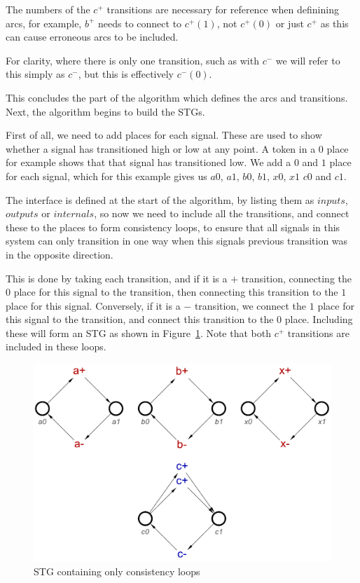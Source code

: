 \documentclass[british,conference,compsoc]{IEEEtran}
\begin{document}
The numbers of the $c^{+}$ transitions are necessary for reference
when definining arcs, for example, $b^{+}$ needs to connect to 
$c^{+}(1)$, not $c^{+}(0)$ or just $c^{+}$ as this can cause 
erroneous arcs to be included. 

For clarity, where there is only one transition, such as with $c^{-}$
we will refer to this simply as $c^{-}$, but this is effectively $c^{-}(0)$.

This concludes the part of the algorithm which defines the arcs
and transitions. Next, the algorithm begins to build the STGs. 

First of all, we need to add places for each signal. These are used to
show whether a signal has transitioned high or low at any point. 
A token in a $0$ place for example shows that that signal has 
transitioned low. We add a $0$ and $1$ place for each signal, 
which for this example gives us $a0$, $a1$, $b0$, $b1$, $x0$, $x1$
$c0$ and $c1$.

The interface is defined at the start of the algorithm, by listing them as $inputs$,
$outputs$ or $internals$, so now we need to include all the transitions, and
connect these to the places to form consistency loops, to ensure that all signals 
in this system can only transition in one way when this signals previous transition
was in the opposite direction. 

This is done by taking each transition, and if it is a $+$ transition, connecting 
the $0$ place for this signal to the transition, then connecting this transition to 
the $1$ place for this signal. Conversely, if it is a $-$ transition, we connect the
$1$ place for this signal to the transition, and connect this transition to the $0$ 
place. Including these will form an STG as shown in Figure~\ref{fig:loops}. Note
that both $c^{+}$ transitions are included in these loops.

\begin{figure}[h]
\begin{centering}
\includegraphics[scale=0.25]{Images/or-gate-ctrl-loops-stg}
\par\end{centering}
\protect\caption{\label{fig:loops} STG containing only consistency loops}
\end{figure}
\end{document}
